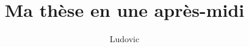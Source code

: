 \documentclass[10pt,a4paper,twoside,onecolumn]{book}
\title{Ma thèse en une après-midi}
\author{Ludovic}
\begin{document}
\maketitle
\dominitoc%
\tableofcontents

\frontmatter %

\mainmatter %

\backmatter %
\end{document}
